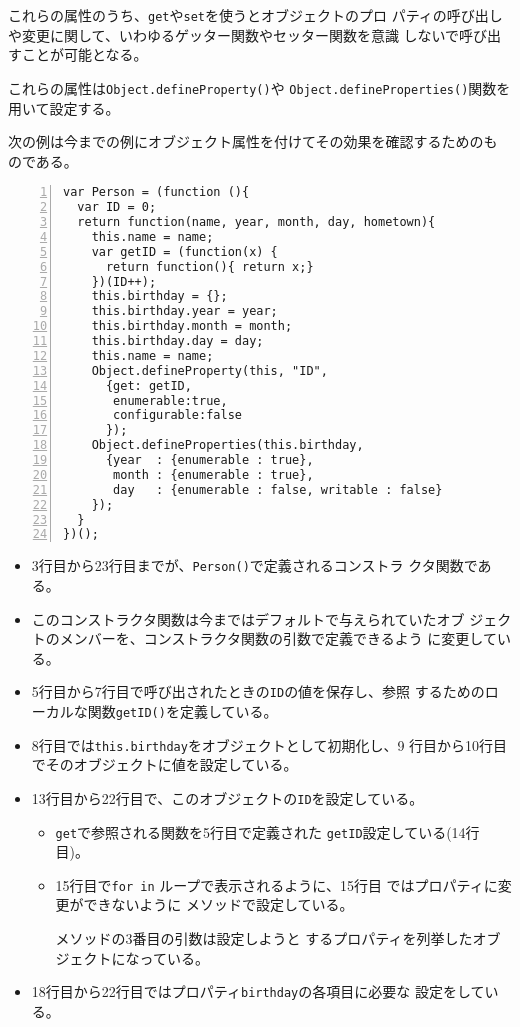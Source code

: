 これらの属性のうち、\texttt{get}や\texttt{set}を使うとオブジェクトのプロ
パティの呼び出しや変更に関して、いわゆるゲッター関数やセッター関数を意識
しないで呼び出すことが可能となる。

これらの属性は\texttt{Object.defineProperty()}や
\texttt{Object.defineProperties()}関数を用いて設定する。
%
\newpage
 \begin{Exec}\upshape\label{OP}
	次の例は今までの例にオブジェクト属性を付けてその効果を確認するためのも
	のである。
\begin{Verbatim}[numbers=left]
var Person = (function (){
  var ID = 0;
  return function(name, year, month, day, hometown){
    this.name = name;
    var getID = (function(x) {
      return function(){ return x;}
    })(ID++);
    this.birthday = {};
    this.birthday.year = year;
    this.birthday.month = month;
    this.birthday.day = day;
    this.name = name;
    Object.defineProperty(this, "ID",
      {get: getID,
       enumerable:true,
       configurable:false
      });
    Object.defineProperties(this.birthday,
      {year  : {enumerable : true},
       month : {enumerable : true},
       day   : {enumerable : false, writable : false}
    });
  }
})();
\end{Verbatim}
	\begin{itemize}
	 \item 3行目から23行目までが、\texttt{Person()}で定義されるコンストラ
				 クタ関数である。
	 \item このコンストラクタ関数は今まではデフォルトで与えられていたオブ
				 ジェクトのメンバーを、コンストラクタ関数の引数で定義できるよう
				 に変更している。
	 \item 5行目から7行目で呼び出されたときの\texttt{ID}の値を保存し、参照
				 するためのローカルな関数\texttt{getID()}を定義している。
	 \item 8行目では\texttt{this.birthday}をオブジェクトとして初期化し、9
				 行目から10行目でそのオブジェクトに値を設定している。
	 \item 13行目から22行目で、このオブジェクトの\texttt{ID}を設定している。
				 \begin{itemize}\upshape
					\item \texttt{get}で参照される関数を5行目で定義された
								\texttt{getID}設定している(14行目)。
					\item 15行目で\texttt{for in} ループで表示されるように、15行目
								ではプロパティに変更ができないように
								メソッドで設定している。

								メソッドの3番目の引数は設定しようと
								するプロパティを列挙したオブジェクトになっている。
				 \end{itemize}
	 \item 18行目から22行目ではプロパティ\texttt{birthday}の各項目に必要な
				 設定をしている。
	\end{itemize}
 \end{Exec}
